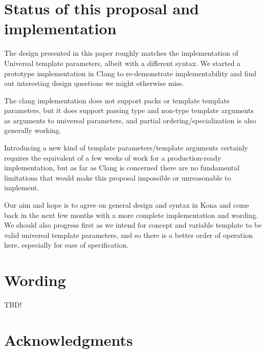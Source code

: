 \documentclass{wg21}
\begin{document}
\section{Status of this proposal and implementation}

The design presented in this paper roughly matches the implementation of Universal template parameters, albeit with a different syntax.
We started a prototype implementation in Clang to re-demonstrate implementability and find out interesting design questions we might otherwise
miss.

The clang implementation does not support packs or template template parameters, but it does support passing type and non-type template arguments
as arguments to universal parameters, and partial ordering/specialization is also generally working.

Introducing a new kind of template parameters/template arguments certainly requires the equivalent of a few weeks of work for a production-ready implementation,
but as far as Clang is concerned there are no fundamental limitations that would make this proposal impossible or unreasonable to implement.


Our aim and hope is to agree on general design and syntax in Kona and come back in the next few months with a more complete implementation and wording.
We should also progress  first as we intend for concept and variable template to be valid universal template parameters,
and so there is a better order of operation here, especially for ease of specification.

\section{Wording}

TBD!

\section{Acknowledgments}





\renewcommand{\section}[2]{}%

\begin{thebibliography}{9}


\end{thebibliography}
\end{document}

